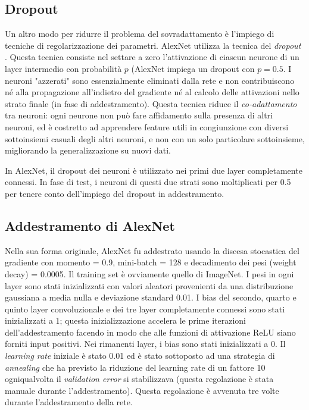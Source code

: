 \subsection{Dropout}
\label{dropout}
Un altro modo per ridurre il problema del sovradattamento è l'impiego di tecniche di regolarizzazione dei parametri. AlexNet utilizza la tecnica del \textit{dropout} \cite{dropout}. Questa tecnica consiste nel settare a zero l'attivazione di ciascun neurone di un layer intermedio con probabilità $p$ (AlexNet impiega un dropout con $p=0.5$. I neuroni "azzerati" sono essenzialmente eliminati dalla rete e non contribuiscono né alla propagazione all'indietro del gradiente né al calcolo delle attivazioni nello strato finale (in fase di addestramento). Questa tecnica riduce il \textit{co-adattamento} tra neuroni: ogni neurone non può fare affidamento sulla presenza di altri neuroni, ed è costretto ad apprendere feature utili in congiunzione con diversi sottoinsiemi casuali degli altri neuroni, e non con un solo particolare sottoinsieme, migliorando la generalizzazione su nuovi dati.

In AlexNet, il dropout dei neuroni è utilizzato nei primi due layer completamente connessi. In fase di test, i neuroni di questi due strati sono moltiplicati per 0.5 per tenere conto dell'impiego del dropout in addestramento.

\subsection{Addestramento di AlexNet}
Nella sua forma originale, AlexNet fu addestrato usando la discesa stocastica del gradiente con momento = 0.9, mini-batch = 128 e decadimento dei pesi (weight decay) = 0.0005. Il training set è ovviamente quello di ImageNet.
I pesi in ogni layer sono stati inizializzati con valori aleatori provenienti da una distribuzione gaussiana a media nulla e deviazione standard 0.01. I bias del secondo, quarto e quinto layer convoluzionale e dei tre layer completamente connessi sono stati inizializzati a 1; questa inizializzazione accelera le prime iterazioni dell'addestramento facendo in modo che alle funzioni di attivazione ReLU siano forniti input positivi. Nei rimanenti layer, i bias sono stati inizializzati a 0. Il \textit{learning rate} iniziale è stato 0.01 ed è stato sottoposto ad una strategia di \textit{annealing} che ha previsto la riduzione del learning rate di un fattore 10 ogniqualvolta il \textit{validation error} si stabilizzava (questa regolazione è stata manuale durante l'addestramento). Questa regolazione è avvenuta tre volte durante l'addestramento della rete.

